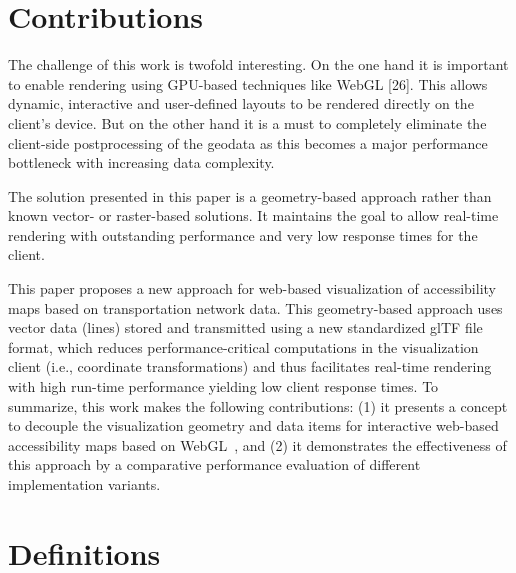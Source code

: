   \section{Contributions}
    The challenge of this work is twofold interesting. On the one hand it is important to enable rendering using GPU-based techniques like WebGL [26]. This allows dynamic, interactive and user-defined layouts to be rendered directly on the client's device. But on the other hand it is a must to completely eliminate the client-side postprocessing of the geodata as this becomes a major performance bottleneck with increasing data complexity.\par
    The solution presented in this paper is a geometry-based approach rather than known vector- or raster-based solutions. It maintains the goal to allow real-time rendering with outstanding performance and very low response times for the client.\par

    This paper proposes a new approach for web-based visualization of accessibility
    maps based on transportation network data. This geometry-based approach uses vector
    data (lines) stored and transmitted using a new standardized glTF file format, which
    reduces performance-critical computations in the visualization client (i.e., coordinate
    transformations) and thus facilitates real-time rendering with high run-time performance
    yielding low client response times. To summarize, this work makes the following contributions:
    (1) it presents a concept to decouple the visualization geometry and data items for
    interactive web-based accessibility maps based on Web\-GL~\cite{Jackson2016}, and (2)
    it demonstrates the effectiveness of this approach by a comparative performance
    evaluation of different implementation variants.\par
  \section{Definitions}
